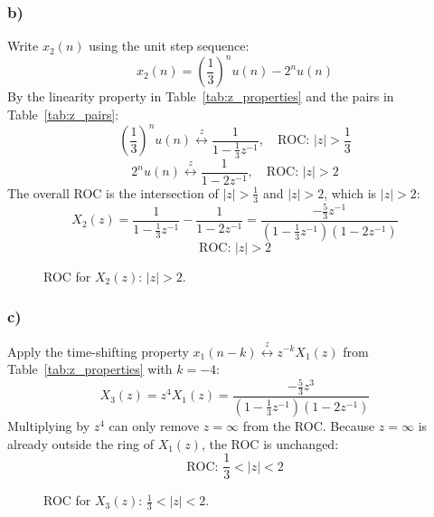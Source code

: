 \documentclass[12pt,a4paper]{article}
\begin{document}
\subsubsection*{b)}
Write $x_2(n)$ using the unit step sequence:
\[
x_2(n) = \left(\frac{1}{3}\right)^n u(n) - 2^n u(n)
\]
By the linearity property in Table~\ref{tab:z_properties} and the pairs in Table~\ref{tab:z_pairs}:
\[
\left(\frac{1}{3}\right)^n u(n) \stackrel{z}{\longleftrightarrow} \frac{1}{1 - \frac{1}{3}z^{-1}}, \quad \text{ROC: } |z| > \frac{1}{3}
\]
\[
2^n u(n) \stackrel{z}{\longleftrightarrow} \frac{1}{1 - 2z^{-1}}, \quad \text{ROC: } |z| > 2
\]
The overall ROC is the intersection of $|z| > \frac{1}{3}$ and $|z| > 2$, which is $|z| > 2$:
\[
X_2(z) = \frac{1}{1 - \frac{1}{3}z^{-1}} - \frac{1}{1 - 2z^{-1}} = \frac{-\frac{5}{3}z^{-1}}{\left(1 - \frac{1}{3}z^{-1}\right)(1 - 2z^{-1})}
\]
\[
\text{ROC: } |z| > 2
\]

\begin{figure}[H]
\centering
{}
\caption{ROC for $X_2(z)$: $|z| > 2$.}
\label{fig:p33_roc_b}
\end{figure}

\subsubsection*{c)}
Apply the time-shifting property $x_1(n - k) \stackrel{z}{\longleftrightarrow} z^{-k}X_1(z)$ from Table~\ref{tab:z_properties} with $k = -4$:
\[
X_3(z) = z^4 X_1(z) = \frac{-\frac{5}{3}z^3}{\left(1 - \frac{1}{3}z^{-1}\right)(1 - 2z^{-1})}
\]
Multiplying by $z^4$ can only remove $z = \infty$ from the ROC. Because $z = \infty$ is already outside the ring of $X_1(z)$, the ROC is unchanged:
\[
\text{ROC: } \frac{1}{3} < |z| < 2
\]

\begin{figure}[H]
\centering
{}
\caption{ROC for $X_3(z)$: $\frac{1}{3} < |z| < 2$.}
\label{fig:p33_roc_c}
\end{figure}
\end{document}

